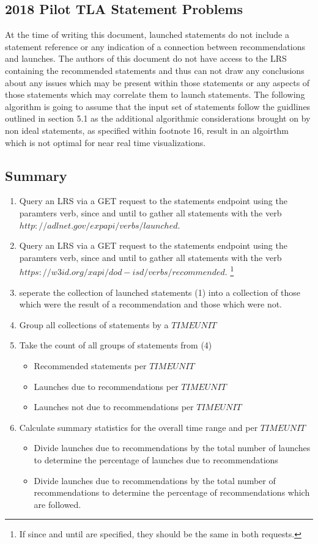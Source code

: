 \documentclass{article}
\begin{document}
\subsection{2018 Pilot TLA Statement Problems}
At the time of writing this document, launched statements do not
include a statement reference or any indication of a connection
between recommendations and launches. The authors of this document do
not have access to the LRS containing the recommended statements and
thus can not draw any conclusions about any issues which may be
present within those statements or any aspects of those statements
which may correlate them to launch statements. The following algorithm
is going to assume that the input set of statements follow the
guidlines outlined in section 5.1 as the additional algorithmic
considerations brought on by non ideal statements, as specified within
footnote 16, result in an algoirthm which is not optimal for near real
time visualizations.

\subsection{Summary}
\begin{enumerate}
  \item Query an LRS via a GET request to the statements endpoint
    using the paramters verb, since and until to gather all statements
    with the verb $http://adlnet.gov/expapi/verbs/launched$.
  \item Query an LRS via a GET request to the statements endpoint
    using the paramters verb, since and until to gather all statements
    with the verb $https://w3id.org/xapi/dod-isd/verbs/recommended$.
    \footnote{\label{sameSession} If since and until are specified,
      they should be the same in both requests.}
  \item seperate the collection of launched statements (1) into a
    collection of those which were the result of a recommendation and
    those which were not.
  \item Group all collections of statements by a $TIMEUNIT$
  \item Take the count of all groups of statements from (4)
    \begin{itemize}
    \item Recommended statements per $TIMEUNIT$
    \item Launches due to recommendations per $TIMEUNIT$
    \item Launches not due to recommendations per $TIMEUNIT$
    \end{itemize}
  \item Calculate summary statistics for the overall time range and
    per $TIMEUNIT$
    \begin{itemize}
    \item Divide launches due to recommendations by the total number of
      launches to determine the percentage of launches due to
      recommendations
    \item Divide launches due to recommendations by the total number
      of recommendations to determine the percentage of
      recommendations which are followed.
    \end{itemize}
\end{enumerate}
\end{document}
